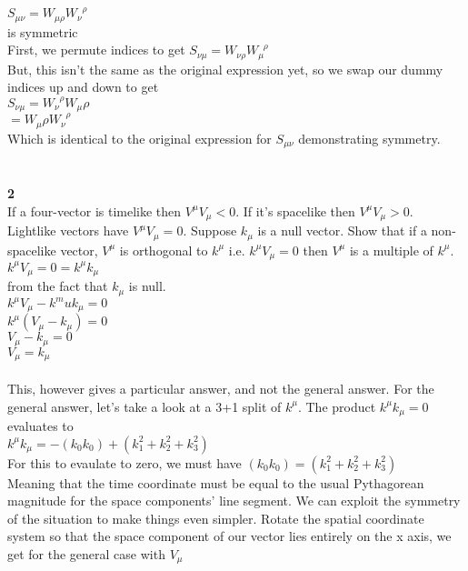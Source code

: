\documentclass[prb,preprint]
{revtex4-1}
\newcommand{\PRLsep}{\noindent\makebox[\linewidth]{\resizebox{0.8888\linewidth}{2pt}{$\bullet$}}\bigskip}
\begin{document}
\\
$S_{\mu\nu} = W_{\mu\rho}W_\nu^{\;\;\rho}$
\\
is symmetric
\\
First, we permute indices to get
$S_{\nu\mu} = W_{\nu\rho}W_\mu^{\;\;\rho}$
\\
But, this isn't the same as the original expression yet, so we swap our dummy indices up and down to get 
\\
$S_{\nu\mu} = W_{\nu}^{\;\;\rho}W_\mu\rho$
\\
$= W_\mu\rho W_{\nu}^{\;\;\rho}$
\\
Which is identical to the original expression for $S_{\mu\nu}$ demonstrating symmetry.
\\
\PRLsep
\\
\\
\textbf{2}
\\
If a four-vector is timelike then $V^\mu V_\mu < 0$.  If it's spacelike then $V^\mu V_\mu > 0 $.  Lightlike vectors have $V^\mu V_\mu = 0$.  Suppose $k_\mu$ is a null vector.  Show that if a non-spacelike vector, $V^\mu$ is orthogonal to $k^\mu$ i.e. $k^\mu V_\mu = 0$ then $V^\mu$ is a multiple of $k^\mu$.
\\
$k^\mu V_\mu = 0 = k^\mu k_\mu$
\\
from the fact that $k_\mu$ is null.
\\
$k^\mu V_\mu - k^mu k_\mu = 0$
\\
$k^\mu\left(V_\mu - k_\mu\right) = 0$
\\
$V_\mu - k_\mu = 0$
\\
$V_\mu = k_\mu$
\\
\\
This, however gives a particular answer, and not the general answer.  For the general answer, let's take a look at a 3+1 split of $k^\mu$.  The product $k^\mu k_\mu = 0$ evaluates to 
\\
$k^\mu k_\mu = -\left(k_0 k_0\right) + \left(k_1^2 + k_2^2 + k_3^2\right)$
\\
For this to evaulate to zero, we must have 
$\left(k_0 k_0\right) = \left(k_1^2 + k_2^2 + k_3^2\right)$
\\
Meaning that the time coordinate must be equal to the usual Pythagorean magnitude for the space components' line segment.  We can exploit the symmetry of the situation to make things even simpler.  Rotate the spatial coordinate system so that the space component of our vector lies entirely on the x axis, we get for the general case with $V_\mu$
\\
\end{document}
